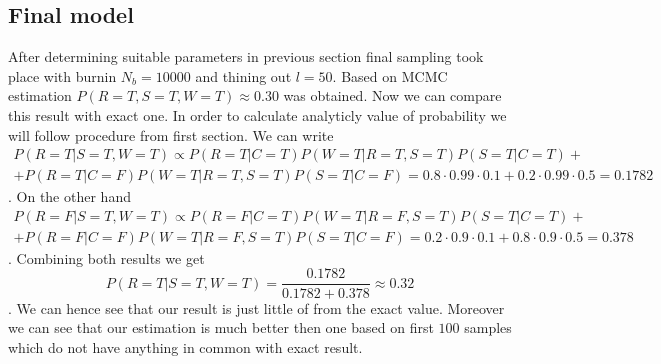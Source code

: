 \documentclass[12pt,a4paper]{article}
\begin{document}
\subsection{Final model}
\hspace{1cm} After determining suitable parameters in previous section final sampling took place with burnin $N_b=10000$ and thining out $l=50$. Based on
MCMC estimation $P(R=T,S=T,W=T)\approx 0.30$ was obtained. Now we can compare this result with exact one. In order to calculate analyticly value of probability 
we will follow procedure from first section. We can write
\begin{align*}
    P(R=T|S=T,W=T)\propto P(R=T|C=T)P(W=T|R=T,S=T)P(S=T|C=T)+\\ +P(R=T|C=F)P(W=T|R=T,S=T)P(S=T|C=F)=0.8\cdot0.99\cdot0.1+0.2\cdot 0.99\cdot0.5=0.1782
\end{align*}
. On the other hand
\begin{align*}
    P(R=F|S=T,W=T)\propto P(R=F|C=T)P(W=T|R=F,S=T)P(S=T|C=T)+\\ +P(R=F|C=F)P(W=T|R=F,S=T)P(S=T|C=F)=0.2\cdot0.9\cdot 0.1+0.8\cdot 0.9\cdot 0.5=0.378
\end{align*}.
Combining both results we get 
\begin{equation*}
    P(R=T|S=T,W=T)=\frac{0.1782}{0.1782+0.378}\approx 0.32
\end{equation*}. We can hence see that our result is just little of from the exact value. Moreover we can see that our estimation is much better then one
based on first $100$ samples which do not have anything in common with exact result.
\end{document}
